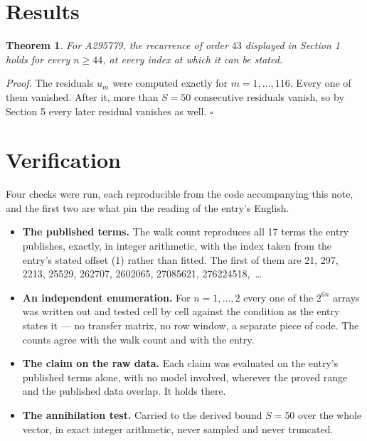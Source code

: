 \documentclass[11pt]{article}
\newtheorem{theorem}{Theorem}
\theoremstyle{definition}
\begin{document}
\section{Results}

\begin{theorem} For A295779, the recurrence of order $43$ displayed in Section 1 holds for every $n \ge 44$, at every index at which it can be stated.\end{theorem}

{\itshape Proof.} The residuals $u_m$ were computed exactly for $m = 1,\dots,116$. Every one of them vanished. After it, more than $S = 50$ consecutive residuals vanish, so by Section 5 every later residual vanishes as well. $\square$

\section{Verification}

Four checks were run, each reproducible from the code accompanying this note, and the first two are what pin the reading of the entry's English.

\begin{itemize}

\item {\bfseries The published terms.} The walk count reproduces all 17 terms the entry publishes, exactly, in integer arithmetic, with the index taken from the entry's stated offset (1) rather than fitted. The first of them are 21, 297, 2213, 25529, 262707, 2602065, 27085621, 276224518,~\dots

\item {\bfseries An independent enumeration.} For $n = 1,\dots,2$ every one of the $2^{6n}$ arrays was written out and tested cell by cell against the condition as the entry states it --- no transfer matrix, no row window, a separate piece of code. The counts agree with the walk count and with the entry.

\item {\bfseries The claim on the raw data.} Each claim was evaluated on the entry's published terms alone, with no model involved, wherever the proved range and the published data overlap. It holds there.

\item {\bfseries The annihilation test.} Carried to the derived bound $S = 50$ over the whole vector, in exact integer arithmetic, never sampled and never truncated.

\end{itemize}
\end{document}
